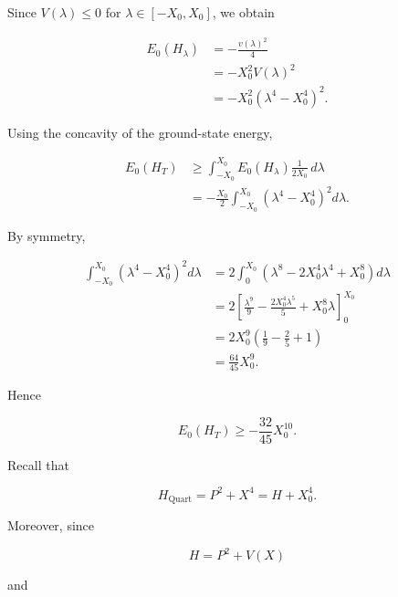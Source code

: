 \documentclass{article}
\theoremstyle{definition}
\begin{document}
Since $V(\lambda)\leq 0$ for $\lambda\in[-X_0,X_0]$, we obtain

\begin{align}
    E_0(H_\lambda)
    &=
    -\frac{v(\lambda)^2}{4}
    \\
    &=
    -X_0^2 V(\lambda)^2
    \\
    &=
    -X_0^2
    \left(\lambda^4-X_0^4\right)^2.
\end{align}

Using the concavity of the ground-state energy,

\begin{align}
    E_0(H_T)
    &\geq
    \int_{-X_0}^{X_0}
    E_0(H_\lambda)
    \frac{1}{2X_0}\,d\lambda
    \\
    &=
    -\frac{X_0}{2}
    \int_{-X_0}^{X_0}
    \left(\lambda^4-X_0^4\right)^2
    d\lambda.
\end{align}

By symmetry,

\begin{align}
    \int_{-X_0}^{X_0}
    \left(\lambda^4-X_0^4\right)^2
    d\lambda
    &=
    2
    \int_0^{X_0}
    \left(
        \lambda^8
        -2X_0^4\lambda^4
        +X_0^8
    \right)d\lambda
    \\
    &=
    2
    \left[
        \frac{\lambda^9}{9}
        -
        \frac{2X_0^4\lambda^5}{5}
        +
        X_0^8\lambda
    \right]_0^{X_0}
    \\
    &=
    2X_0^9
    \left(
        \frac{1}{9}
        -
        \frac{2}{5}
        +
        1
    \right)
    \\
    &=
    \frac{64}{45}X_0^9.
\end{align}

Hence

\begin{equation}
    \boxed{
        E_0(H_T)
        \geq
        -\frac{32}{45}X_0^{10}
    }.
\end{equation}

Recall that

\begin{equation}
    H_{\mathrm{Quart}}
    =
    P^2+X^4
    =
    H+X_0^4.
\end{equation}

Moreover, since

\begin{equation}
    H
    =
    P^2+V(X)
\end{equation}

and
\end{document}
